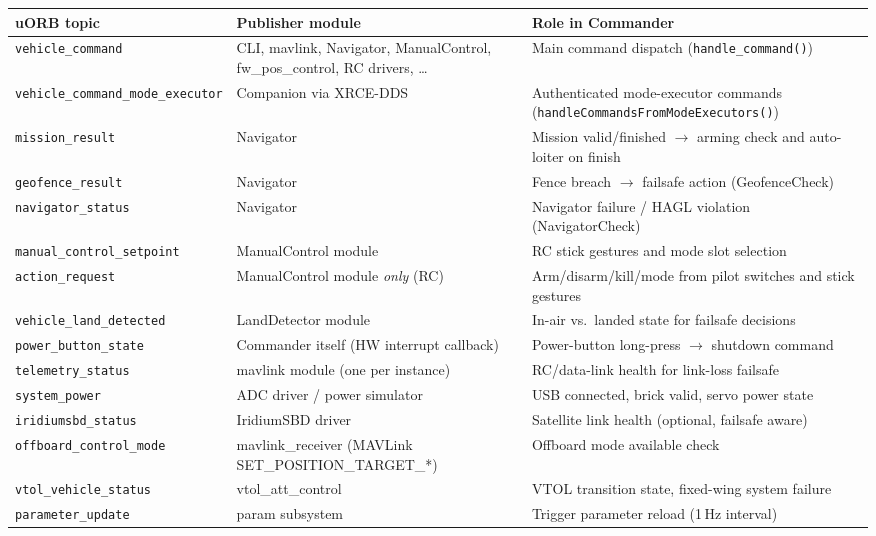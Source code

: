 \documentclass[12pt,a4paper]{article}
\begin{document}
\begin{center}
\scriptsize
\begin{tabular}{p{4.5cm}p{3.5cm}p{5.5cm}}\toprule
uORB topic & Publisher module & Role in Commander \\\midrule
\texttt{vehicle\_command}
  & CLI, mavlink, Navigator, ManualControl, fw\_pos\_control, RC drivers, \ldots
  & Main command dispatch (\texttt{handle\_command()}) \\
\texttt{vehicle\_command\_mode\_executor}
  & Companion via XRCE-DDS
  & Authenticated mode-executor commands (\texttt{handleCommandsFromModeExecutors()}) \\
\texttt{mission\_result}
  & Navigator
  & Mission valid/finished $\to$ arming check and auto-loiter on finish \\
\texttt{geofence\_result}
  & Navigator
  & Fence breach $\to$ failsafe action (GeofenceCheck) \\
\texttt{navigator\_status}
  & Navigator
  & Navigator failure / HAGL violation (NavigatorCheck) \\
\texttt{manual\_control\_setpoint}
  & ManualControl module
  & RC stick gestures and mode slot selection \\
\texttt{action\_request}
  & ManualControl module \emph{only} (RC)
  & Arm/disarm/kill/mode from pilot switches and stick gestures \\
\texttt{vehicle\_land\_detected}
  & LandDetector module
  & In-air vs.\ landed state for failsafe decisions \\
\texttt{power\_button\_state}
  & Commander itself (HW interrupt callback)
  & Power-button long-press $\to$ shutdown command \\
\texttt{telemetry\_status}
  & mavlink module (one per instance)
  & RC/data-link health for link-loss failsafe \\
\texttt{system\_power}
  & ADC driver / power simulator
  & USB connected, brick valid, servo power state \\
\texttt{iridiumsbd\_status}
  & IridiumSBD driver
  & Satellite link health (optional, failsafe aware) \\
\texttt{offboard\_control\_mode}
  & mavlink\_receiver (MAVLink SET\_POSITION\_TARGET\_*)
  & Offboard mode available check \\
\texttt{vtol\_vehicle\_status}
  & vtol\_att\_control
  & VTOL transition state, fixed-wing system failure \\
\texttt{parameter\_update}
  & param subsystem
  & Trigger parameter reload (1\,Hz interval) \\

\end{tabular}
\end{center}
\end{document}
